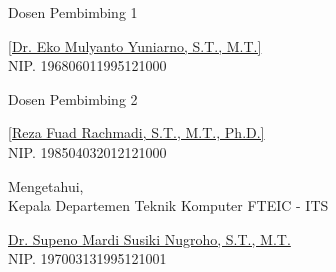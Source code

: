   \begin{center}
  
    \begin{multicols}{2}
  
      Dosen Pembimbing 1
      \vspace{12ex}
  
      \underline{[Dr. Eko Mulyanto Yuniarno, S.T., M.T.]} \\
      NIP. 196806011995121000
  
      \columnbreak
  
      Dosen Pembimbing 2
      \vspace{12ex}
  
      \underline{[Reza Fuad Rachmadi, S.T., M.T., Ph.D.]} \\
      NIP. 198504032012121000
  
    \end{multicols}
    \vspace{6ex}
  
    Mengetahui, \\
    Kepala Departemen Teknik Komputer FTEIC - ITS
    \vspace{12ex}
  
    \underline{Dr. Supeno Mardi Susiki Nugroho, S.T., M.T.} \\
    NIP. 197003131995121001
  
  \end{center}